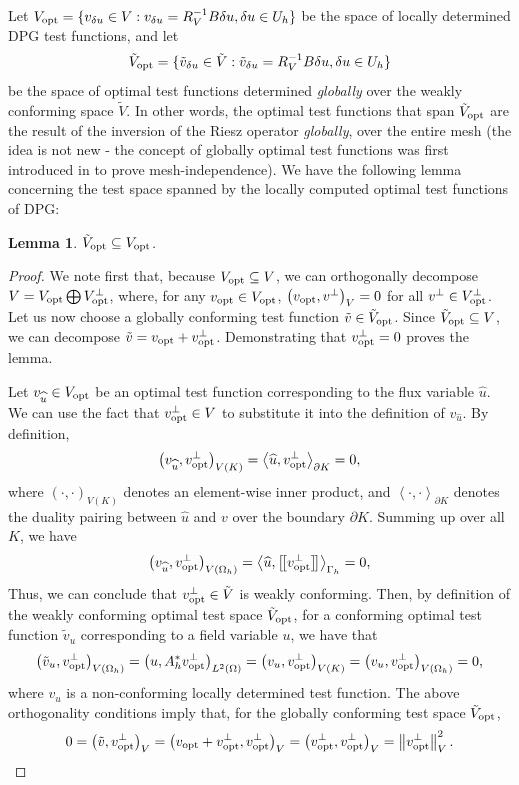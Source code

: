 \documentclass[11pt,onecolumn]{scrartcl}
\newcommand{\nor}[1]{\left\| #1 \right\|}
\newcommand{\LRp}[1]{\left( #1 \right)}
\newcommand{\LRs}[1]{\left[ #1 \right]}
\newcommand{\LRa}[1]{\left\langle #1 \right\rangle}
\newcommand{\jump}[1] {\ensuremath{\LRs{\!\left[#1\right]\!}}}
\newcommand{\uh}{\widehat{u}}
\newcommand{\Gh}{\Gamma_h}
\newcommand{\Oh}{\Omega_h}
\newtheorem{lemma}{Lemma}
\begin{document}
Let $V_{\rm opt} = \{v_{\delta u} \in V: v_{\delta u}= R_V^{-1}B\delta u, \delta u \in U_h\}$ be the space of locally determined DPG test functions, and let 
\[
\tilde{V}_{\rm opt} = \{\tilde{v}_{\delta u} \in \tilde{V}: \tilde{v}_{\delta u} = R_{V}^{-1}B\delta u, \delta u \in U_h\}
\]
be the space of optimal test functions determined \textit{globally} over the weakly conforming space $\tilde{V}$.  In other words, the optimal test functions that span $\tilde{V}_{\rm opt}$ are the result of the inversion of the Riesz operator \textit{globally}, over the entire mesh (the idea is not new - the concept of globally optimal test functions was first introduced in \cite{DPG3pub} to prove mesh-independence).  We have the following lemma concerning the test space spanned by the locally computed optimal test functions of DPG: 
\begin{lemma}
\label{lemma1}
$\tilde{V}_{\rm opt} \subseteq V_{\rm opt}$.
\end{lemma}
\begin{proof}
We note first that, because $V_{\rm opt} \subseteq V$, we can orthogonally decompose $V = V_{\rm opt} \bigoplus V_{\rm opt}^\perp$, where, for any $v_{\rm opt}\in V_{\rm opt}$, $\LRp{v_{\rm opt},v^\perp}_V = 0$ for all $v^\perp \in V_{\rm opt}^\perp$.  Let us now choose a globally conforming test function $\tilde{v}\in \tilde{V}_{\rm opt}$.  Since $\tilde{V}_{\rm opt} \subseteq V$, we can decompose $\tilde{v} = v_{\rm opt} + v_{\rm opt}^\perp$.  Demonstrating that $v_{\rm opt}^\perp = 0$ proves the lemma.  

Let $v_{\uh} \in V_{\rm opt}$ be an optimal test function corresponding to the flux variable $\uh$.  We can use the fact that $v_{\rm opt}^\perp \in V$ to substitute it into the definition of $v_{\uh}$.  By definition, 
\[
\LRp{v_{\uh},v_{\rm opt}^\perp}_{V(K)} = \LRa{\uh,v_{\rm opt}^\perp}_{\partial K} = 0,
\]
where $\LRp{\cdot,\cdot}_{V(K)}$ denotes an element-wise inner product, and $\LRa{\cdot,\cdot}_{\partial K}$ denotes the duality pairing between $\uh$ and $v$ over the boundary $\partial K$.  Summing up over all $K$, we have
\[
\LRp{v_{\uh},v_{\rm opt}^\perp}_{V(\Oh)} = \LRa{\uh,\jump{v_{\rm opt}^\perp}}_{\Gh} = 0,
\]
Thus, we can conclude that $v_{\rm opt}^\perp \in \tilde{V}$ is weakly conforming.  Then, by definition of the weakly conforming optimal test space $\tilde{V}_{\rm opt}$, for a conforming optimal test function $\tilde{v}_u$ corresponding to a field variable $u$, we have that
\[
\LRp{\tilde{v}_u,v_{\rm opt}^\perp}_{V(\Oh)} = \LRp{u,A^*_h v_{\rm opt}^\perp}_{L^2(\Omega)} = \LRp{v_u, v_{\rm opt}^\perp}_{V(K)} = \LRp{v_u, v_{\rm opt}^\perp}_{V(\Oh)} = 0,
\]
where $v_u$ is a non-conforming locally determined test function.  The above orthogonality conditions imply that, for the globally conforming test space $\tilde{V}_{\rm opt}$, 
\[
0 = \LRp{\tilde{v},v_{\rm opt}^\perp}_V = \LRp{v_{\rm opt} + v_{\rm opt}^\perp,v_{\rm opt}^\perp}_V = \LRp{v_{\rm opt}^\perp,v_{\rm opt}^\perp}_V = \nor{v_{\rm opt}^\perp}_V^2.
\]
\end{proof}
\end{document}
